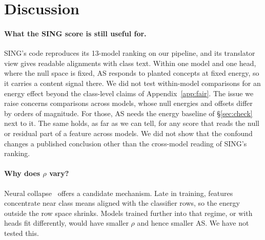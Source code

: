 \documentclass[10pt]{article}
\begin{document}
\section{Discussion}
\label{sec:disc}
\paragraph{What the SING score is still useful for.}
SING's code reproduces its 13-model ranking on our pipeline, and its translator view gives readable alignments with class text. Within one model and one head, where the null space is fixed, AS responds to planted concepts at fixed energy, so it carries a content signal there. We did not test within-model comparisons for an energy effect beyond the class-level claims of Appendix~\ref{app:fair}. The issue we raise concerns comparisons across models, whose null energies and offsets differ by orders of magnitude. For those, AS needs the energy baseline of \S\ref{sec:check} next to it. The same holds, as far as we can tell, for any score that reads the null or residual part of a feature across models. We did not show that the confound changes a published conclusion other than the cross-model reading of SING's ranking.

\paragraph{Why does $\rho$ vary?}
Neural collapse~\citep{papyan2020collapse} offers a candidate mechanism.
Late in training, features concentrate near class means aligned with the classifier rows, so the energy outside the row space shrinks.
Models trained further into that regime, or with heads fit differently, would have smaller $\rho$ and hence smaller AS.
We have not tested this.
\end{document}
